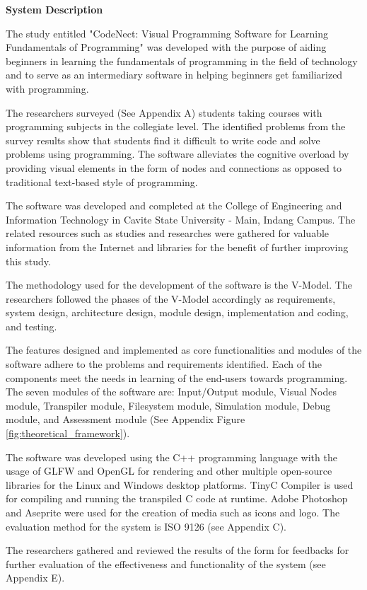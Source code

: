 \flushleft
\textbf{System Description}
\justifying

\parx
The study entitled "CodeNect: Visual Programming Software for Learning
Fundamentals of Programming" was developed with the purpose of aiding beginners
in learning the fundamentals of programming in the field of technology and to serve
as an intermediary software in helping beginners get familiarized with programming.

\parx
The researchers surveyed (See Appendix A) students taking
courses with programming subjects in the collegiate level. The identified
problems from the survey results show that students find it difficult to write
code and solve problems using programming. The software alleviates the
cognitive overload by providing visual elements in the form of nodes and
connections as opposed to traditional text-based style of programming.

\parx
The software was developed and completed at the College of Engineering and
Information Technology in Cavite State University - Main, Indang Campus. The
related resources such as studies and researches were gathered for valuable
information from the Internet and libraries for the benefit of further improving
this study.

\parx
The methodology used for the development of the software is the V-Model. The
researchers followed the phases of the V-Model accordingly as requirements,
system design, architecture design, module design, implementation and coding,
and testing.

\parx
The features designed and implemented as core functionalities and modules of the
software adhere to the problems and requirements identified. Each of the components
meet the needs in learning of the end-users towards programming. The seven modules
of the software are: Input/Output module, Visual Nodes module, Transpiler module,
Filesystem module, Simulation module, Debug module, and Assessment module
(See Appendix Figure \ref{fig:theoretical_framework}).

\parx
The software was developed using the C++ programming language with the usage of
GLFW and OpenGL for rendering and other multiple open-source libraries for the
Linux and Windows desktop platforms. TinyC Compiler is used for compiling and
running the transpiled C code at runtime. Adobe Photoshop and Aseprite were
used for the creation of media such as icons and logo. The evaluation method
for the system is ISO 9126 (see Appendix C).

\parx
The researchers gathered and reviewed the results of the form for feedbacks for
further evaluation of the effectiveness and functionality of the system (see Appendix E).
